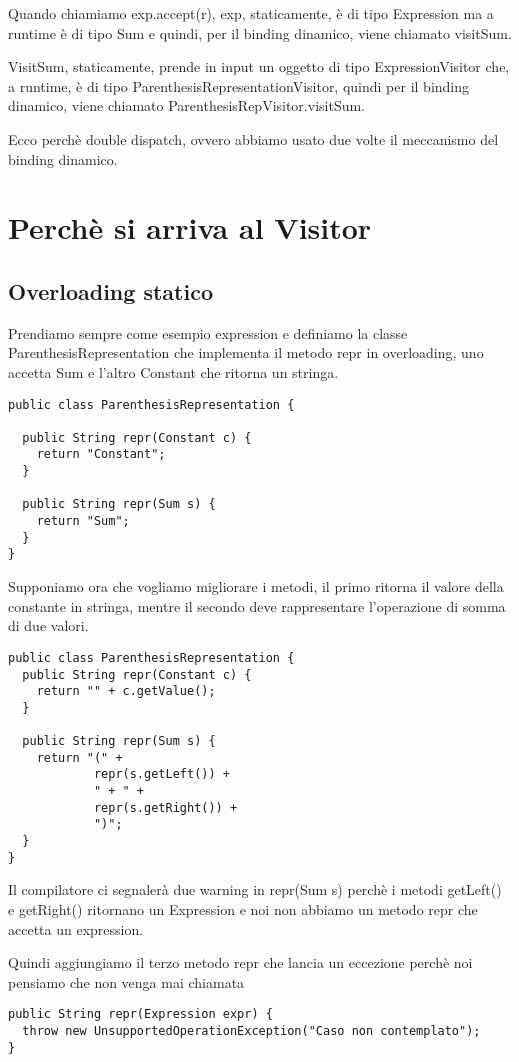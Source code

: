 Quando chiamiamo exp.accept(r), exp, staticamente, è di tipo Expression ma a runtime è di tipo Sum e quindi, per il binding dinamico, viene chiamato visitSum.

VisitSum, staticamente, prende in input un oggetto di tipo ExpressionVisitor che, a runtime, è di tipo ParenthesisRepresentationVisitor, quindi per il binding dinamico, 
viene chiamato ParenthesisRepVisitor.visitSum.

Ecco perchè double dispatch, ovvero abbiamo usato due volte il meccanismo del binding dinamico.

\section{Perchè si arriva al Visitor}

\subsection{Overloading statico}
Prendiamo sempre come esempio expression e definiamo la classe ParenthesisRepresentation che implementa il metodo repr in overloading, uno accetta Sum e l'altro 
Constant che ritorna un stringa.
\begin{lstlisting}
public class ParenthesisRepresentation {
  
  public String repr(Constant c) {
    return "Constant";
  }
  
  public String repr(Sum s) {
    return "Sum";
  }
}   
\end{lstlisting}

Supponiamo ora che vogliamo migliorare i metodi, il primo ritorna il valore della constante in stringa, mentre il secondo deve rappresentare l'operazione di 
somma di due valori.
\begin{lstlisting}
public class ParenthesisRepresentation {
  public String repr(Constant c) {
    return "" + c.getValue();
  }

  public String repr(Sum s) {
    return "(" +
            repr(s.getLeft()) +
            " + " +
            repr(s.getRight()) +
            ")";
  }
}
\end{lstlisting}

Il compilatore ci segnalerà due warning in repr(Sum s) perchè i metodi getLeft() e getRight() ritornano un Expression e noi non abbiamo un metodo repr che 
accetta un expression.

Quindi aggiungiamo il terzo metodo repr che lancia un eccezione perchè noi pensiamo che non venga mai chiamata
\begin{lstlisting}
public String repr(Expression expr) {
  throw new UnsupportedOperationException("Caso non contemplato");
}   
\end{lstlisting}

